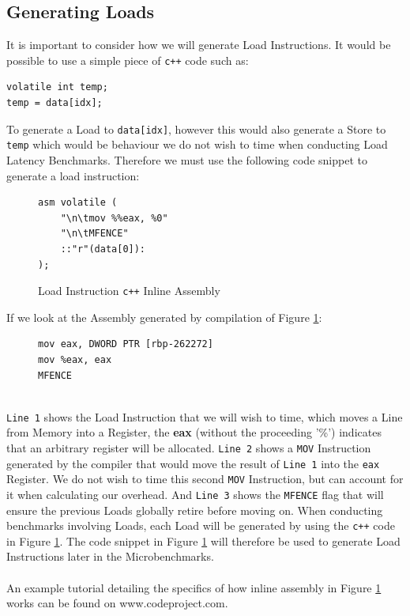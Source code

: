 \documentclass[bsc,frontabs,twoside,singlespacing,parskip,deptreport]{infthesis}     %
\begin{document}

\subsection{Generating Loads}\label{sec:gen-loads}
It is important to consider how we will generate Load Instructions. It would be possible to use a simple piece of \texttt{c++} code such as:
\begin{verbatim}
volatile int temp;
temp = data[idx];
\end{verbatim}
To generate a Load to \texttt{data[idx]}, however this would also generate a Store to \texttt{temp} which would be behaviour we do not wish to time when conducting Load Latency Benchmarks. Therefore we must use the following code snippet to generate a load instruction:
\begin{figure}[!h]
    \centering
    \begin{minipage}{0.4\textwidth}
    \begin{verbatim}
asm volatile (
    "\n\tmov %%eax, %0"
    "\n\tMFENCE"
    ::"r"(data[0]):
);
    \end{verbatim}
    \end{minipage}
    \caption{Load Instruction \texttt{c++} Inline Assembly }
    \label{fig:load-inst-code}
\end{figure}

If we look at the Assembly generated by compilation of Figure \ref{fig:load-inst-code}:
\begin{figure}[!h]
    \centering
    \begin{minipage}{0.4\textwidth}
    \begin{verbatim}
mov eax, DWORD PTR [rbp-262272]
mov %eax, eax
MFENCE
    \end{verbatim}
    \end{minipage}
\end{figure} \\
\texttt{Line 1} shows the Load Instruction that we will wish to time, which moves a Line from Memory into a Register, the \textbf{eax} (without the proceeding '\%') indicates that an arbitrary register will be allocated. \texttt{Line 2} shows a \texttt{MOV} Instruction generated by the compiler that would move the result of \texttt{Line 1} into the \texttt{eax} Register. We do not wish to time this second \texttt{MOV} Instruction, but can account for it when calculating our overhead. And \texttt{Line 3} shows the \texttt{MFENCE} flag that will ensure the previous Loads globally retire before moving on. When conducting benchmarks involving Loads, each Load will be generated by using the \texttt{c++} code in Figure \ref{fig:load-inst-code}. The code snippet in Figure \ref{fig:load-inst-code} will therefore be used to generate Load Instructions later in the Microbenchmarks. \\
\\
An example tutorial detailing the specifics of how inline assembly in Figure \ref{fig:load-inst-code} works can be found on www.codeproject.com\cite{inline_asm_tut}.
\end{document}
